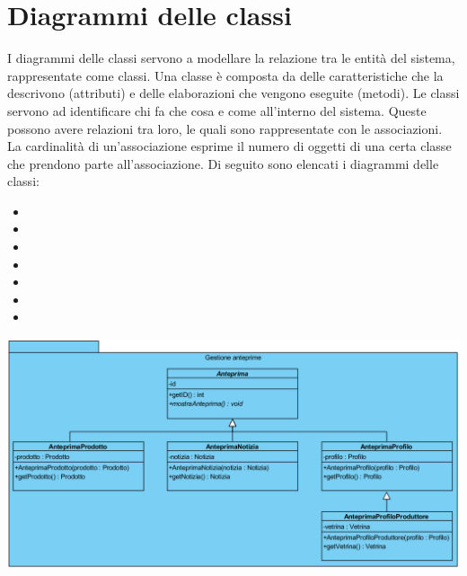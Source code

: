 \section{Diagrammi delle classi}  \label{cha:classi}
I diagrammi delle classi servono a modellare la relazione tra le entità del sistema, rappresentate come classi.
Una classe è composta da delle caratteristiche che la descrivono (attributi) e delle elaborazioni che vengono eseguite (metodi). 
Le classi servono ad identificare chi fa che cosa e come all’interno del sistema. Queste possono avere relazioni tra loro, le quali sono rappresentate con le associazioni. La cardinalità di un’associazione esprime il numero di oggetti di una certa classe che prendono parte all’associazione. Di seguito sono elencati i diagrammi delle classi:
\begin{itemize}
	\item {}
	\item {}
	\item {}
	\item {}
	\item {}
	\item {}
	\item {}
\end{itemize}


\begin{center}
			\includegraphics[width=\textwidth]{assets/visualParadigm/classi/GestioneAnteprime}
\end{center}

